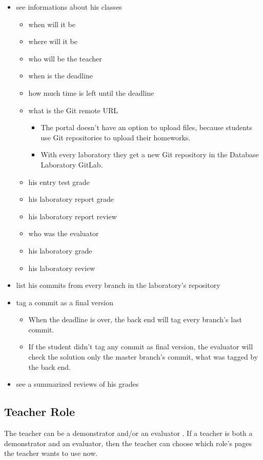 \begin{itemize}
	\item see informations about his classes
	\begin{itemize}
		\item when will it be
		\item where will it be
		\item who will be the teacher
		\item when is the deadline
		\item how much time is left until the deadline
		\item what is the Git remote URL
		\begin{itemize}
			\item The portal doesn't have an option to upload files, because students use Git repositories to upload their homeworks.
			\item With every laboratory they get a new Git repository in the Database Laboratory GitLab.
		\end{itemize}
		\item his entry test grade
		\item his laboratory report grade
		\item his laboratory report review
		\item who was the evaluator
		\item his laboratory grade
		\item his laboratory review
	\end{itemize}
	\item list his commits from every branch in the laboratory's repository
	\item tag a commit as a final version
	\begin{itemize}
		\item When the deadline is over, the back end will tag every branch's last commit.
		\item If the student didn't tag any commit as final version, the evaluator will check the solution only the master branch's commit, what was tagged by the back end.
	\end{itemize}
	\item see a summarized reviews of his grades
\end{itemize}

\subsection{Teacher Role}

The teacher can be a demonstrator and/or an evaluator . If a teacher is both a demonstrator and an evaluator, then the teacher can choose which role's pages the teacher wants to use now.

